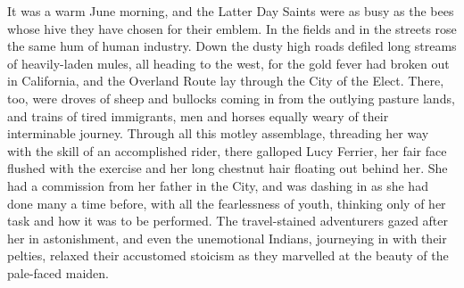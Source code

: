 \documentclass[12pt,english]{book}
\begin{document}
It was a warm June morning, and the Latter Day Saints were as busy
as the bees whose hive they have chosen for their emblem. In the fields
and in the streets rose the same hum of human industry. Down the dusty
high roads defiled long streams of heavily-laden mules, all heading
to the west, for the gold fever had broken out in California, and
the Overland Route lay through the City of the Elect. There, too,
were droves of sheep and bullocks coming in from the outlying pasture
lands, and trains of tired immigrants, men and horses equally weary
of their interminable journey. Through all this motley assemblage,
threading her way with the skill of an accomplished rider, there galloped
Lucy Ferrier, her fair face flushed with the exercise and her long
chestnut hair floating out behind her. She had a commission from her
father in the City, and was dashing in as she had done many a time
before, with all the fearlessness of youth, thinking only of her task
and how it was to be performed. The travel-stained adventurers gazed
after her in astonishment, and even the unemotional Indians, journeying
in with their pelties, relaxed their accustomed stoicism as they marvelled
at the beauty of the pale-faced maiden.
\end{document}
